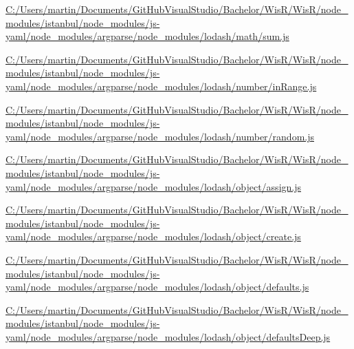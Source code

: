 \begin{DoxyCompactItemize}
\item 
\hyperlink{_c_1_2_users_2martin_2_documents_2_git_hub_visual_studio_2_bachelor_2_wis_r_2_wis_r_2node_moduledda18a5e35cc5b1cb1df48f396dc1d71}{C\+:/\+Users/martin/\+Documents/\+Git\+Hub\+Visual\+Studio/\+Bachelor/\+Wis\+R/\+Wis\+R/node\+\_\+modules/istanbul/node\+\_\+modules/js-\/yaml/node\+\_\+modules/argparse/node\+\_\+modules/lodash/math/sum.\+js}
\item 
\hyperlink{_c_1_2_users_2martin_2_documents_2_git_hub_visual_studio_2_bachelor_2_wis_r_2_wis_r_2node_modulef8c0dd72a8fd557af7c65ca7970ad020}{C\+:/\+Users/martin/\+Documents/\+Git\+Hub\+Visual\+Studio/\+Bachelor/\+Wis\+R/\+Wis\+R/node\+\_\+modules/istanbul/node\+\_\+modules/js-\/yaml/node\+\_\+modules/argparse/node\+\_\+modules/lodash/number/in\+Range.\+js}
\item 
\hyperlink{_c_1_2_users_2martin_2_documents_2_git_hub_visual_studio_2_bachelor_2_wis_r_2_wis_r_2node_module0cbcbb6d3992d4dafbdf0e4ccb6635aa}{C\+:/\+Users/martin/\+Documents/\+Git\+Hub\+Visual\+Studio/\+Bachelor/\+Wis\+R/\+Wis\+R/node\+\_\+modules/istanbul/node\+\_\+modules/js-\/yaml/node\+\_\+modules/argparse/node\+\_\+modules/lodash/number/random.\+js}
\item 
\hyperlink{_c_1_2_users_2martin_2_documents_2_git_hub_visual_studio_2_bachelor_2_wis_r_2_wis_r_2node_module1c848bede40d3b853decb8d13fba72dc}{C\+:/\+Users/martin/\+Documents/\+Git\+Hub\+Visual\+Studio/\+Bachelor/\+Wis\+R/\+Wis\+R/node\+\_\+modules/istanbul/node\+\_\+modules/js-\/yaml/node\+\_\+modules/argparse/node\+\_\+modules/lodash/object/assign.\+js}
\item 
\hyperlink{_c_1_2_users_2martin_2_documents_2_git_hub_visual_studio_2_bachelor_2_wis_r_2_wis_r_2node_module09ee77f78c0d693488ab0307da8e8e5a}{C\+:/\+Users/martin/\+Documents/\+Git\+Hub\+Visual\+Studio/\+Bachelor/\+Wis\+R/\+Wis\+R/node\+\_\+modules/istanbul/node\+\_\+modules/js-\/yaml/node\+\_\+modules/argparse/node\+\_\+modules/lodash/object/create.\+js}
\item 
\hyperlink{_c_1_2_users_2martin_2_documents_2_git_hub_visual_studio_2_bachelor_2_wis_r_2_wis_r_2node_module51b45e0b680fcf32f6d4c91ece01ea69}{C\+:/\+Users/martin/\+Documents/\+Git\+Hub\+Visual\+Studio/\+Bachelor/\+Wis\+R/\+Wis\+R/node\+\_\+modules/istanbul/node\+\_\+modules/js-\/yaml/node\+\_\+modules/argparse/node\+\_\+modules/lodash/object/defaults.\+js}
\item 
\hyperlink{_c_1_2_users_2martin_2_documents_2_git_hub_visual_studio_2_bachelor_2_wis_r_2_wis_r_2node_module94bf64cfd31e0f2b8303f6685d276031}{C\+:/\+Users/martin/\+Documents/\+Git\+Hub\+Visual\+Studio/\+Bachelor/\+Wis\+R/\+Wis\+R/node\+\_\+modules/istanbul/node\+\_\+modules/js-\/yaml/node\+\_\+modules/argparse/node\+\_\+modules/lodash/object/defaults\+Deep.\+js}

\end{DoxyCompactItemize}
